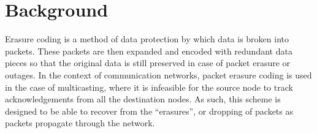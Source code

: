 \section{Background}
\label{sec:background}

Erasure coding is a method of data protection by which data is 
broken into packets. These packets are then expanded and encoded 
with redundant data pieces so that the original data is still preserved 
in case of packet erasure or outages. In the context of communication 
networks, packet erasure coding \cite{WalrandParekh2017} is used in the case of multicasting, 
where it is infeasible for the source node to track acknowledgements from 
all the destination nodes. As such, this scheme is designed to be able to 
recover from the “erasures”, or dropping of packets as packets propagate 
through the network.